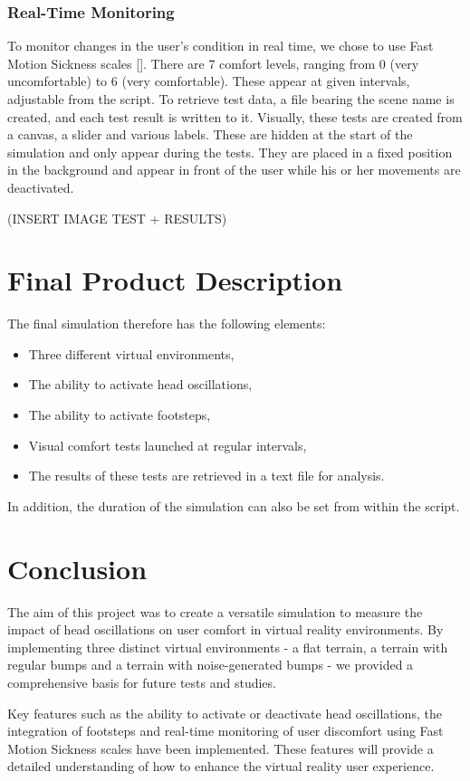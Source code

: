 \documentclass[american]{acmtog} %
\begin{document}
\subsubsection{Real-Time Monitoring}
To monitor changes in the user's condition in real time, we chose to use Fast Motion Sickness scales [\cite{course}]. There are 7 comfort levels, ranging from 0 (very uncomfortable) to 6 (very comfortable). These appear at given intervals, adjustable from the script. To retrieve test data, a file bearing the scene name is created, and each test result is written to it. Visually, these tests are created from a canvas, a slider and various labels. These are hidden at the start of the simulation and only appear during the tests. They are placed in a fixed position in the background and appear in front of the user while his or her movements are deactivated.

(INSERT IMAGE TEST + RESULTS)


\section{Final Product Description}
\label{sec:product}
The final simulation therefore has the following elements:
\begin{itemize}[label=\textbullet]
    \item Three different virtual environments,
    \item The ability to activate head oscillations,
    \item The ability to activate footsteps,
    \item Visual comfort tests launched at regular intervals,
    \item The results of these tests are retrieved in a text file for analysis.
\end{itemize}
In addition, the duration of the simulation can also be set from within the script.

\section{Conclusion}
\label{sec:conclusion}
The aim of this project was to create a versatile simulation to measure the impact of head oscillations on user comfort in virtual reality environments. By implementing three distinct virtual environments - a flat terrain, a terrain with regular bumps and a terrain with noise-generated bumps - we provided a comprehensive basis for future tests and studies.

Key features such as the ability to activate or deactivate head oscillations, the integration of footsteps and real-time monitoring of user discomfort using Fast Motion Sickness scales have been implemented. These features will provide a detailed understanding of how to enhance the virtual reality user experience.
\end{document}
